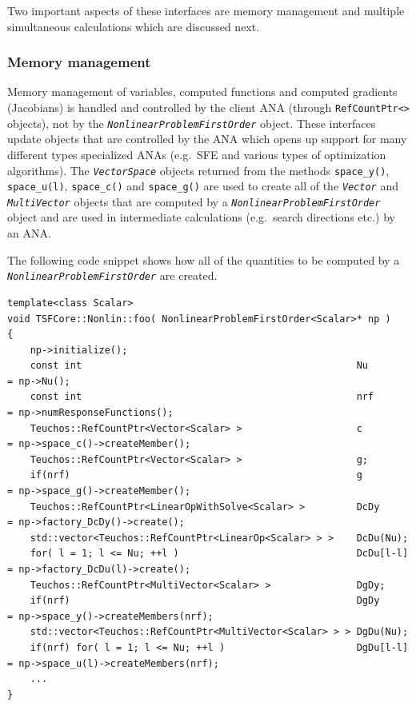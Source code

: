 Two important aspects of these interfaces are memory management and
multiple simultaneous calculations which are discussed next.

%
\subsubsection{Memory management}
%

Memory management of variables, computed functions and computed
gradients (Jacobians) is handled and controlled by the client ANA
(through \texttt{RefCountPtr<>} objects), not by the
\texttt{\textit{Nonlinear\-Problem\-First\-Order}} object.  These
interfaces update objects that are controlled by the ANA which opens up
support for many different types specialized ANAs (e.g.~SFE
\cite{ref:sfe} and various types of optimization algorithms).  The
\texttt{\textit{Vector\-Space}} objects returned from the methods
\texttt{space\_y()}, \texttt{space\_u(l)}, \texttt{space\_c()} and
\texttt{space\_g()} are used to create all of the \texttt{\textit{Vector}}
and \texttt{\textit{Multi\-Vector}} objects that are computed by a
\texttt{\textit{Nonlinear\-Problem\-First\-Order}} object and
are used in intermediate calculations (e.g.~search directions etc.) by
an ANA.

The following code snippet shows how all of the quantities to be
computed by a \texttt{\textit{Nonlinear\-Problem\-First\-Order}}
are created.

{\scriptsize\begin{verbatim}
template<class Scalar>
void TSFCore::Nonlin::foo( NonlinearProblemFirstOrder<Scalar>* np )
{
    np->initialize();
    const int                                                Nu        = np->Nu();
    const int                                                nrf       = np->numResponseFunctions();
    Teuchos::RefCountPtr<Vector<Scalar> >                    c         = np->space_c()->createMember();
    Teuchos::RefCountPtr<Vector<Scalar> >                    g;
    if(nrf)                                                  g         = np->space_g()->createMember();
    Teuchos::RefCountPtr<LinearOpWithSolve<Scalar> >         DcDy      = np->factory_DcDy()->create();
    std::vector<Teuchos::RefCountPtr<LinearOp<Scalar> > >    DcDu(Nu);
    for( l = 1; l <= Nu; ++l )                               DcDu[l-l] = np->factory_DcDu(l)->create();
    Teuchos::RefCountPtr<MultiVector<Scalar> >               DgDy;
    if(nrf)                                                  DgDy      = np->space_y()->createMembers(nrf);
    std::vector<Teuchos::RefCountPtr<MultiVector<Scalar> > > DgDu(Nu);
    if(nrf) for( l = 1; l <= Nu; ++l )                       DgDu[l-l] = np->space_u(l)->createMembers(nrf);
    ...
}
\end{verbatim}}

